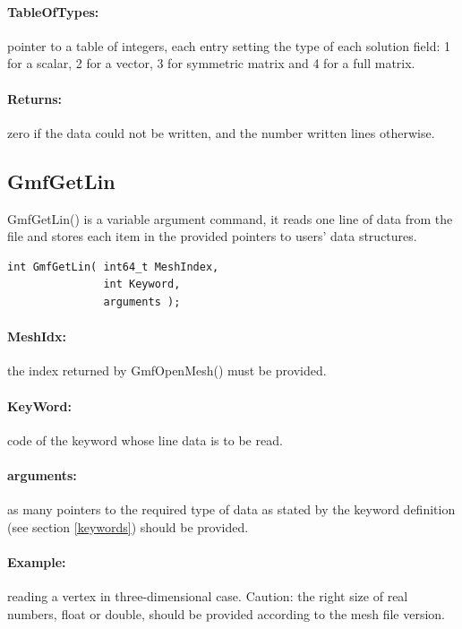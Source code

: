 \documentclass[a4paper,12pt]{article}
\begin{document}
\paragraph{TableOfTypes:} pointer to a table of integers, each entry setting the type of each solution field: 1 for a scalar, 2 for a vector, 3 for symmetric matrix and 4 for a full matrix.

\paragraph{Returns:} zero if the data could not be written, and the number written lines otherwise.


\subsection{GmfGetLin}
GmfGetLin() is a variable argument command, it reads one line of data from the file and stores each item in the provided pointers to users' data structures.

\begin{tt}
\begin{verbatim}
int GmfGetLin( int64_t MeshIndex,
               int Keyword,
               arguments );
\end{verbatim}
\end{tt}
\normalfont

\paragraph{MeshIdx:}
the index returned by GmfOpenMesh() must be provided.

\paragraph{KeyWord:} code of the keyword whose line data is to be read.

\paragraph{arguments:} as many pointers to the required type of data as stated by the keyword definition (see section \ref{keywords}) should be provided.

\paragraph{Example:} reading a vertex in three-dimensional case. Caution: the right size of real numbers, float or double, should be provided according to the mesh file version.
\end{document}
